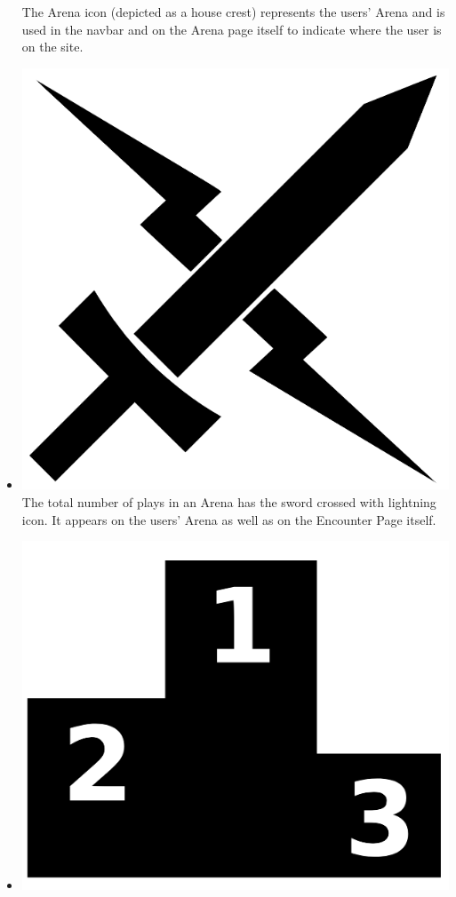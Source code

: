 \documentclass[12pt,a4paper]{report}
\begin{document}
\begin{itemize}
		The Arena icon (depicted as a house crest) represents the users' Arena and is used in the navbar and on the Arena page itself to indicate where the user is on the site.
		\begin{figure}
			\label{fig: Arena Icon}
		\end{figure}
		\item \includegraphics[scale=.03]{sword_lightning}
		The total number of plays in an Arena has the sword crossed with lightning icon. It appears on the users' Arena as well as on the Encounter Page itself.
		\begin{figure}
			\label{fig: Total Plays Icon}
		\end{figure}
		\item \includegraphics[scale=.03]{win_rate}

\end{itemize}
\end{document}
